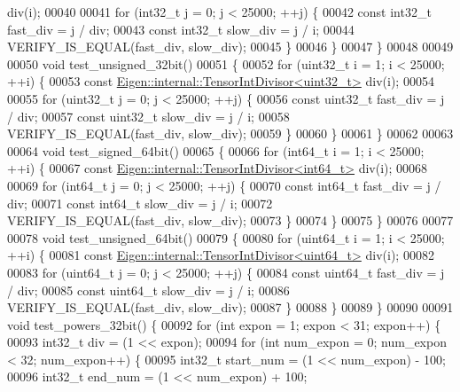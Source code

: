 \begin{DoxyCode}
      div(i);
00040 
00041     \textcolor{keywordflow}{for} (int32\_t j = 0; j < 25000; ++j) \{
00042       \textcolor{keyword}{const} int32\_t fast\_div = j / div;
00043       \textcolor{keyword}{const} int32\_t slow\_div = j / i;
00044       VERIFY\_IS\_EQUAL(fast\_div, slow\_div);
00045     \}
00046   \}
00047 \}
00048 
00049 
00050 \textcolor{keywordtype}{void} test\_unsigned\_32bit()
00051 \{
00052   \textcolor{keywordflow}{for} (uint32\_t i = 1; i < 25000; ++i) \{
00053     \textcolor{keyword}{const} \hyperlink{struct_eigen_1_1internal_1_1_tensor_int_divisor}{Eigen::internal::TensorIntDivisor<uint32\_t>} div(i);
00054 
00055     \textcolor{keywordflow}{for} (uint32\_t j = 0; j < 25000; ++j) \{
00056       \textcolor{keyword}{const} uint32\_t fast\_div = j / div;
00057       \textcolor{keyword}{const} uint32\_t slow\_div = j / i;
00058       VERIFY\_IS\_EQUAL(fast\_div, slow\_div);
00059     \}
00060   \}
00061 \}
00062 
00063 
00064 \textcolor{keywordtype}{void} test\_signed\_64bit()
00065 \{
00066   \textcolor{keywordflow}{for} (int64\_t i = 1; i < 25000; ++i) \{
00067     \textcolor{keyword}{const} \hyperlink{struct_eigen_1_1internal_1_1_tensor_int_divisor}{Eigen::internal::TensorIntDivisor<int64\_t>} div(i);
00068 
00069     \textcolor{keywordflow}{for} (int64\_t j = 0; j < 25000; ++j) \{
00070       \textcolor{keyword}{const} int64\_t fast\_div = j / div;
00071       \textcolor{keyword}{const} int64\_t slow\_div = j / i;
00072       VERIFY\_IS\_EQUAL(fast\_div, slow\_div);
00073     \}
00074   \}
00075 \}
00076 
00077 
00078 \textcolor{keywordtype}{void} test\_unsigned\_64bit()
00079 \{
00080   \textcolor{keywordflow}{for} (uint64\_t i = 1; i < 25000; ++i) \{
00081     \textcolor{keyword}{const} \hyperlink{struct_eigen_1_1internal_1_1_tensor_int_divisor}{Eigen::internal::TensorIntDivisor<uint64\_t>} div(i);
00082 
00083     \textcolor{keywordflow}{for} (uint64\_t j = 0; j < 25000; ++j) \{
00084       \textcolor{keyword}{const} uint64\_t fast\_div = j / div;
00085       \textcolor{keyword}{const} uint64\_t slow\_div = j / i;
00086       VERIFY\_IS\_EQUAL(fast\_div, slow\_div);
00087     \}
00088   \}
00089 \}
00090 
00091 \textcolor{keywordtype}{void} test\_powers\_32bit() \{
00092   \textcolor{keywordflow}{for} (\textcolor{keywordtype}{int} expon = 1; expon < 31; expon++) \{
00093     int32\_t div = (1 << expon);
00094     \textcolor{keywordflow}{for} (\textcolor{keywordtype}{int} num\_expon = 0; num\_expon < 32; num\_expon++) \{
00095       int32\_t start\_num = (1 << num\_expon) - 100;
00096       int32\_t end\_num = (1 << num\_expon) + 100;

\end{DoxyCode}
